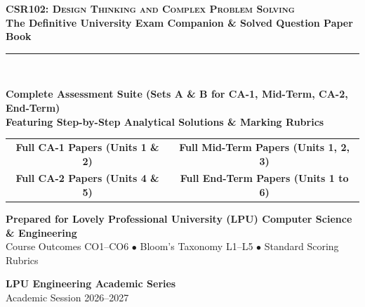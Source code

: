 \begin{titlepage}
\pagecolor{LPUNavy}
\color{white}
\vspace*{1.5cm}

\begin{center}
    {\Huge \bfseries \scshape CSR102: Design Thinking and Complex Problem Solving}\\[5mm]
    {\LARGE \bfseries The Definitive University Exam Companion \& Solved Question Paper Book}\\[8mm]
    {\color{LPUOrange}\rule{0.8\textwidth}{2pt}}\\[10mm]

    \begin{tcolorbox}[enhanced, width=0.88\textwidth, colback=white, colframe=LPUOrange, boxrule=1.5pt, arc=3mm, halign=center]
        \color{DarkSlate}
        \vspace{2mm}
        {\Large\bfseries Complete Assessment Suite (Sets A \& B for CA-1, Mid-Term, CA-2, End-Term)}\\[3mm]
        {\large\bfseries Featuring Step-by-Step Analytical Solutions \& Marking Rubrics}\\[3mm]
        \begin{tabular}{cc}
            \color{LPUNavy}\textbf{Full CA-1 Papers (Units 1 \& 2)} & \quad \color{LPUNavy}\textbf{Full Mid-Term Papers (Units 1, 2, 3)} \\
            \color{LPUNavy}\textbf{Full CA-2 Papers (Units 4 \& 5)} & \quad \color{LPUNavy}\textbf{Full End-Term Papers (Units 1 to 6)} \\
        \end{tabular}
        \vspace{2mm}
    \end{tcolorbox}

    \vfill

    {\large \bfseries Prepared for Lovely Professional University (LPU) Computer Science \& Engineering}\\[2mm]
    {\small Course Outcomes CO1--CO6 $\bullet$ Bloom's Taxonomy L1--L5 $\bullet$ Standard Scoring Rubrics}\\[10mm]

    \begin{tcolorbox}[width=0.6\textwidth, colback=LPUNavy!80!black, colframe=white, boxrule=0.5pt, halign=center]
        \color{white}
        \textbf{LPU Engineering Academic Series}\\[1mm]
        {\footnotesize Academic Session 2026--2027}
    \end{tcolorbox}
    \vspace*{1cm}
\end{center}
\end{titlepage}
\nopagecolor
\newpage
